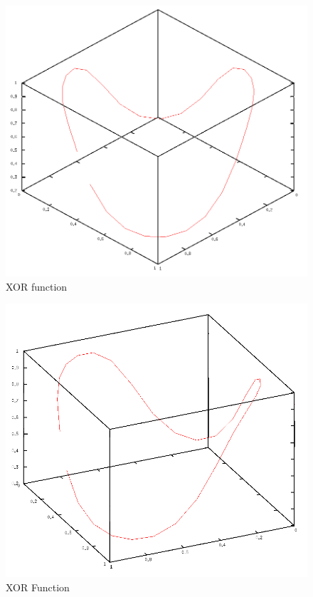 \documentclass{article}
\begin{document}
\begin{figure}[tb]
	\begin{center}
		\includegraphics[scale=0.5]{img/xor1}
	\end{center}
	\caption{XOR function}
	\label{fig:xor1}
\end{figure}

\begin{figure}[tb]
	\begin{center}
		\includegraphics[scale=0.5]{img/xor2}
	\end{center}
	\caption{XOR Function}
	\label{fig:xor2}
\end{figure}
\end{document}

